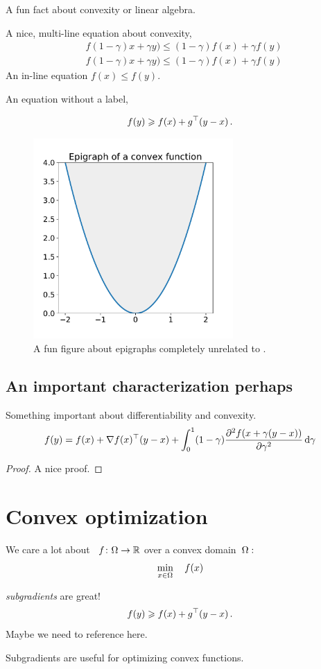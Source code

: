 \documentclass[12pt]{article}
\begin{document}
\begin{fact}
A fun fact about convexity or linear algebra.
\end{fact}

A nice, multi-line equation about convexity,
\begin{align}
& f(1-\gamma)x+\gamma y) \le (1-\gamma)f(x)+\gamma f(y) \\
& f(1-\gamma)x+\gamma y) \le (1-\gamma)f(x)+\gamma f(y)
\end{align}
An in-line equation $f(x) \le f(y)$.

An equation without a label,

\[
f(y) \geqslant f(x) + g^\top (y-x)\,.
\]
\begin{figure}[!ht]
\begin{center}
\includegraphics[width=3in]{figures/lecture1-epigraph}
\end{center}
\caption{A fun figure about epigraphs completely unrelated to .}
\end{figure}
\subsection{An important characterization perhaps}
\begin{proposition}
Something important about differentiability and convexity.
\[
f(y) = f(x)
+ \nabla f(x)^\top (y-x)
+ \int_0^1 (1-\gamma)\frac{\partial^2 f(x+\gamma(y-x))}{\partial\gamma^2}\,\mathrm{d}\gamma
\]
\end{proposition}
\begin{proof}
A nice proof.
\end{proof}


\section{Convex optimization}
We care a lot about ~$f\colon\Omega\to\mathbb{R}$ over a convex domain~$\Omega:$
\[
\min_{x\in\Omega}\quad f(x)
\]

\begin{remark}[Subgradients]
\emph{subgradients} are great!
\[
f(y) \geqslant f(x) + g^\top (y-x)\,.
\]
Maybe we need to reference  here.
\end{remark}

Subgradients are useful for optimizing convex functions.




\end{document}
